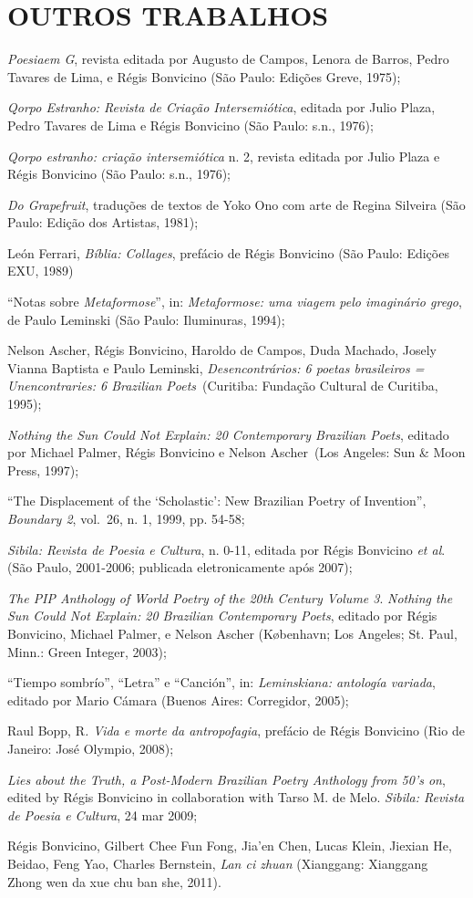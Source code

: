 \section{OUTROS TRABALHOS}

\begin{Parskip}
\emph{Poesiaem G}, revista editada por Augusto de Campos, Lenora de
Barros, Pedro Tavares de Lima, e Régis Bonvicino (São Paulo: Edições
Greve, 1975);

\emph{Qorpo Estranho: Revista de Criação Intersemiótica}, editada por
Julio Plaza, Pedro Tavares de Lima e Régis Bonvicino (São Paulo: s.n.,
1976);

\emph{Qorpo estranho: criação intersemiótica} n. 2, revista editada por
Julio Plaza e Régis Bonvicino (São Paulo: s.n., 1976);

\emph{Do Grapefruit}, traduções de textos de Yoko Ono com arte de Regina
Silveira (São Paulo: Edição dos Artistas, 1981);

León Ferrari, \emph{Bíblia: Collages}, prefácio de Régis Bonvicino (São
Paulo: Edições EXU, 1989)

``Notas sobre \emph{Metaformose}'', in: \emph{Metaformose: uma viagem
pelo imaginário grego}, de Paulo Leminski (São Paulo: Iluminuras, 1994);

Nelson Ascher, Régis Bonvicino, Haroldo de Campos, Duda Machado, Josely
Vianna Baptista e Paulo Leminski, \emph{Desencontrários: 6 poetas
brasileiros = Unencontraries: 6 Brazilian Poets}~(Curitiba: Fundação
Cultural de Curitiba, 1995);

\emph{Nothing the Sun Could Not Explain: 20 Contemporary Brazilian
Poets}, editado por Michael Palmer, Régis Bonvicino e Nelson Ascher~(Los
Angeles: Sun \& Moon Press, 1997);

``The Displacement of the `Scholastic': New Brazilian Poetry of
Invention'', \emph{Boundary 2}, vol.~26, n. 1, 1999, pp. 54-58;

\emph{Sibila: Revista de Poesia e Cultura}, n. 0-11, editada por Régis
Bonvicino \emph{et al}. (São Paulo, 2001-2006; publicada eletronicamente
após 2007);

\emph{The PIP Anthology of World Poetry of the 20th Century Volume 3}.
\emph{Nothing the Sun Could Not Explain: 20 Brazilian Contemporary
Poets}, editado por Régis Bonvicino, Michael Palmer, e Nelson Ascher
(København; Los Angeles; St. Paul, Minn.: Green Integer, 2003);

``Tiempo sombrío'', ``Letra'' e ``Canción'', in: \emph{Leminskiana:
antología variada}, editado por Mario Cámara (Buenos Aires: Corregidor,
2005);

Raul Bopp, R\emph{. Vida e morte da antropofagia}, prefácio de Régis
Bonvicino (Rio de Janeiro: José Olympio, 2008);

\emph{Lies about the Truth, a Post-Modern Brazilian Poetry Anthology
from 50's on}, edited by Régis Bonvicino in collaboration with Tarso M.
de Melo. \emph{Sibila: Revista de Poesia e Cultura}, 24 mar 2009;

Régis Bonvicino, Gilbert Chee Fun Fong, Jia'en Chen, Lucas Klein,
Jiexian He, Beidao, Feng Yao, Charles Bernstein, \emph{Lan ci zhuan}
(Xianggang: Xianggang Zhong wen da xue chu ban she, 2011).
\end{Parskip}

